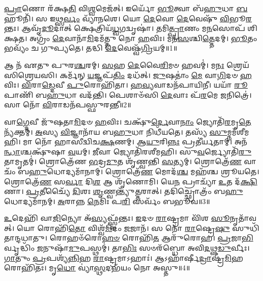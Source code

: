 \setcounter{anuvakam}{0}

\-\ul{𑌪𑍍𑌰𑌾}\-𑌣𑍋 𑌰᳴𑌕𑍍𑌷\-\ul{𑌤𑌿} 𑌵𑌿\-\ul{𑌶𑍍𑌵}\-𑌮𑍇𑌜᳴𑌤𑍍।
𑌇𑌰𑍍𑌯𑍋᳴ \ul{𑌭𑍂}\-𑌤𑍍𑌵𑌾 𑌬᳴\-\ul{𑌹𑍁}\-𑌧𑌾 \ul{𑌬}\-𑌹𑍂𑌨𑌿᳴।
𑌸 𑌇𑌥𑍍𑌸\-\ul{𑌰𑍍𑌵𑌂} 𑌵𑍍𑌯𑌾᳴𑌨𑌶𑍇।
𑌯𑍋 \ul{𑌦𑍇}\-𑌵𑍋 \ul{𑌦𑍇}\-𑌵𑍇𑌷𑍁᳴ \ul{𑌵𑌿}\-𑌭𑍂\-\ul{𑌰}\-𑌨𑍍𑌤𑌃।
𑌆𑌵𑍃᳴\-\ul{𑌦𑍂}\-𑌦𑌾𑌤𑍍 𑌕𑍍𑌷𑍇𑌤𑍍𑌰𑌿𑌯᳴\-\ul{𑌧𑍍𑌵}\-𑌗𑌦𑍍𑌵𑍃𑌷𑌾॑।
𑌤𑌮𑌿\-\ul{𑌤𑍍𑌪𑍍𑌰𑌾}\-𑌣𑌂 𑌮\-\ul{𑌨}\-𑌸𑍋𑌪᳴ 𑌶𑌿𑌕𑍍𑌷𑌤।
𑌅𑌗𑍍𑌰𑌂᳴ \ul{𑌦𑍇}\-𑌵𑌾𑌨𑌾᳴\-\ul{𑌮𑌿}\-𑌦𑌮᳴𑌤𑍍𑌤𑍁 𑌨𑍋 \ul{𑌹}\-𑌵𑌿𑌃।
𑌮𑌨᳴\-\ul{𑌸}\-𑌶𑍍𑌚𑌿\-\ul{𑌤𑍍𑌤𑍇}\-𑌦𑌮𑍍।
\-\ul{𑌭𑍂}\-𑌤𑌂 𑌭𑌵𑍍𑌯𑌂᳴ 𑌚 𑌗𑍁𑌪𑍍𑌯𑌤𑍇।
𑌤𑌦𑍍𑌧𑌿 \ul{𑌦𑍇}\-𑌵𑍇𑌷𑍍𑌵᳴\-\ul{𑌗𑍍𑌰𑌿}\-𑌯𑌮𑍍॥1॥

𑌆 𑌨᳴ 𑌏𑌤𑍁 𑌪𑍁𑌰\-\ul{𑌶𑍍𑌚}\-𑌰𑌮𑍍।
\-\ul{𑌸}\-𑌹 \ul{𑌦𑍇}\-𑌵𑍈\-\ul{𑌰𑌿}\-𑌮𑍞 𑌹𑌵𑌮𑍍॑।
𑌮\-\ul{𑌨𑌃} 𑌶𑍍𑌰𑍇𑌯᳴𑌸𑌿𑌶𑍍𑌰𑍇𑌯𑌸𑌿।
𑌕𑌰𑍍𑌮᳴𑌨𑍍 \ul{𑌯}\-𑌜𑍍𑌞𑌪᳴\-\ul{𑌤𑌿𑌂} 𑌦𑌧᳴𑌤𑍍।
\-\ul{𑌜𑍁}\-𑌷𑌤𑌾𑌂॑ \ul{𑌮𑍇} 𑌵𑌾\-\ul{𑌗𑌿}\-𑌦𑍞 \ul{𑌹}\-𑌵𑌿𑌃।
\-\ul{𑌵𑌿}\-𑌰𑌾\-\ul{𑌡𑍍𑌦𑍇}\-𑌵𑍀 \ul{𑌪𑍁}\-𑌰𑍋𑌹𑌿᳴𑌤𑌾।
\-\ul{𑌹}\-\-\ul{𑌵𑍍𑌯}\-𑌵𑌾𑌡𑌨᳴𑌪𑌾𑌯𑌿𑌨𑍀।
𑌯𑌯𑌾᳴ \ul{𑌰𑍂}\-𑌪𑌾𑌣𑌿᳴ 𑌬\-\ul{𑌹𑍁}\-𑌧𑌾 𑌵𑌦᳴𑌨𑍍𑌤𑌿।
𑌪𑍇𑌶𑌾𑍞᳴𑌸𑌿 \ul{𑌦𑍇}\-𑌵𑌾𑌃 𑌪᳴\-\ul{𑌰}\-𑌮𑍇 \ul{𑌜}\-𑌨𑌿𑌤𑍍𑌰𑍇॑।
𑌸𑌾 𑌨𑍋᳴ \ul{𑌵𑌿}\-𑌰𑌾𑌡𑌨᳴𑌪𑌸𑍍𑌫𑍁𑌰𑌨𑍍𑌤𑍀॥2॥

𑌵𑌾\-\ul{𑌗𑍍𑌦𑍇}\-𑌵𑍀 𑌜𑍁᳴𑌷𑌤𑌾\-\ul{𑌮𑌿}\-𑌦𑍞 \ul{𑌹}\-𑌵𑌿𑌃।
𑌚𑌕𑍍𑌷𑍁᳴\-\ul{𑌰𑍍𑌦𑍇}\-𑌵𑌾\-\ul{𑌨𑌾𑌂} 𑌜𑍍𑌯𑍋𑌤𑌿᳴\-\ul{𑌰}\-𑌮𑍃\-\ul{𑌤𑍇} 𑌨𑍍𑌯᳴𑌕𑍍𑌤𑌮𑍍।
\-\ul{𑌅}\-𑌸𑍍𑌯 \ul{𑌵𑌿}\-𑌜𑍍𑌞𑌾𑌨𑌾᳴𑌯 𑌬\-\ul{𑌹𑍁}\-𑌧𑌾 𑌨𑌿𑌧𑍀᳴𑌯𑌤𑍇।
𑌤𑌸𑍍𑌯᳴ \ul{𑌸𑍁}\-𑌮𑍍𑌨𑌮᳴𑌶𑍀𑌮𑌹𑌿।
𑌮𑌾 𑌨𑍋᳴ 𑌹𑌾𑌸𑍀𑌦𑍍𑌵𑌿𑌚\-\ul{𑌕𑍍𑌷}\-𑌣𑌮𑍍।
𑌆\-\ul{𑌯𑍁}\-𑌰𑌿\-\ul{𑌨𑍍𑌨𑌃} 𑌪𑍍𑌰𑌤𑍀॑𑌰𑍍𑌯𑌤𑌾𑌮𑍍।
𑌅𑌨᳴\-\ul{𑌨𑍍𑌧𑌾}\-𑌶𑍍𑌚𑌕𑍍𑌷𑍁᳴𑌷𑌾 \ul{𑌵}\-𑌯𑌮𑍍।
\-\ul{𑌜𑍀}\-𑌵𑌾 𑌜𑍍𑌯𑍋𑌤𑌿᳴𑌰𑌶𑍀𑌮𑌹𑌿।
𑌸𑍁\-\ul{𑌵}\-𑌰𑍍𑌜𑍍𑌯𑍋𑌤𑌿᳴\-\ul{𑌰𑍁}\-𑌤𑌾𑌮𑍃𑌤𑌮𑍍॑।
𑌶𑍍𑌰𑍋𑌤𑍍𑌰𑍇᳴𑌣 \ul{𑌭}\-𑌦𑍍𑌰\-\ul{𑌮𑍁}\-𑌤 𑌶𑍃᳴𑌣𑍍𑌵𑌨𑍍𑌤𑌿 \ul{𑌸}\-𑌤𑍍𑌯𑌮𑍍।
𑌶𑍍𑌰𑍋𑌤𑍍𑌰𑍇᳴\-\ul{𑌣} 𑌵𑌾𑌚𑌂᳴ 𑌬\-\ul{𑌹𑍁}\-𑌧𑍋𑌦𑍍𑌯𑌮𑌾᳴𑌨𑌾𑌮𑍍।
𑌶𑍍𑌰𑍋𑌤𑍍𑌰𑍇᳴\-\ul{𑌣} 𑌮𑍋𑌦᳴\-\ul{𑌶𑍍𑌚} 𑌮𑌹᳴𑌶𑍍𑌚 𑌶𑍍𑌰𑍂𑌯𑌤𑍇।
𑌶𑍍𑌰𑍋𑌤𑍍𑌰𑍇᳴\-\ul{𑌣} 𑌸\-\ul{𑌰𑍍𑌵𑌾} 𑌦𑌿\-\ul{𑌶} 𑌆 𑌶𑍃᳴𑌣𑍋𑌮𑌿।
𑌯𑍇\-\ul{𑌨} 𑌪𑍍𑌰𑌾𑌚𑍍𑌯𑌾᳴ \ul{𑌉}\-𑌤 𑌦᳴\-\ul{𑌕𑍍𑌷𑌿}\-𑌣𑌾।
\-\ul{𑌪𑍍𑌰}\-𑌤𑍀𑌚𑍍𑌯𑍈᳴ \ul{𑌦𑌿}\-𑌶𑌃 \ul{𑌶𑍃}\-𑌣𑍍𑌵𑌨𑍍𑌤𑍍𑌯𑍁᳴\-\ul{𑌤𑍍𑌤}\-𑌰𑌾𑌤𑍍।
𑌤𑌦𑌿𑌚𑍍𑌛𑍍𑌰𑍋𑌤𑍍𑌰𑌂᳴ 𑌬\-\ul{𑌹𑍁}\-𑌧𑍋𑌦𑍍𑌯𑌮𑌾᳴𑌨𑌮𑍍।
\-\ul{𑌅}\-𑌰𑌾𑌨𑍍𑌨 \ul{𑌨𑍇}\-𑌮𑌿𑌃 𑌪\-\ul{𑌰𑌿} 𑌸𑌰𑍍𑌵𑌂᳴ 𑌬𑌭𑍂𑌵॥3॥\anuvakamend[\-\ul{𑌅}\-\-\ul{𑌗𑍍𑌰𑌿}\-𑌯𑌮𑌨᳴𑌪𑌸𑍍𑌫𑍁𑌰𑌨𑍍𑌤𑍀 \ul{𑌸}\-𑌤𑍍𑌯𑍞 \ul{𑌸}\-𑌪𑍍𑌤 𑌚᳴]

\-\ul{𑌉}\-𑌦𑍇𑌹𑌿᳴ 𑌵𑌾\-\ul{𑌜𑌿}\-𑌨𑍍𑌯𑍋 𑌅᳴\-\ul{𑌸𑍍𑌯}\-𑌫𑍍𑌸𑍍𑌵᳴𑌨𑍍𑌤𑌃।
\-\ul{𑌇}\-𑌦𑍞 \ul{𑌰𑌾}\-𑌷𑍍𑌟𑍍𑌰𑌮𑌾 𑌵𑌿᳴𑌶 \ul{𑌸𑍂}\-𑌨𑍃𑌤𑌾᳴𑌵𑌤𑍍।
𑌯𑍋 𑌰𑍋𑌹𑌿᳴\-\ul{𑌤𑍋} 𑌵𑌿𑌶𑍍𑌵᳴\-\ul{𑌮𑌿}\-𑌦𑌂 \ul{𑌜}\-𑌜𑌾𑌨᳴।
𑌸 𑌨𑍋᳴ \ul{𑌰𑌾}\-𑌷𑍍𑌟𑍍𑌰𑍇\-\ul{𑌷𑍁} 𑌸𑍁𑌧𑌿᳴𑌤𑌾𑌨𑍍𑌦𑌧𑌾𑌤𑍁।
𑌰𑍋𑌹𑍞᳴𑌰𑍋\-\ul{𑌹}\-\-\ul{𑍞} 𑌰𑍋𑌹𑌿᳴\-\ul{𑌤} 𑌆𑌰𑍁᳴𑌰𑍋𑌹।
\-\ul{𑌪𑍍𑌰}\-𑌜𑌾\-\ul{𑌭𑌿}\-𑌰𑍍𑌵𑍃𑌦𑍍𑌧𑌿𑌂᳴ \ul{𑌜}\-𑌨𑍁𑌷𑌾᳴\-\ul{𑌮𑍁}\-𑌪𑌸𑍍𑌥𑌮𑍍॑।
𑌤𑌾\-\ul{𑌭𑌿𑌃} 𑌸𑍞𑌰᳴𑌬𑍍𑌧𑍋 𑌅𑌵𑌿\-\ul{𑌦}\-𑌥𑍍𑌷\-\ul{𑌡𑍁}\-𑌰𑍍𑌵𑍀𑌃।
\-\ul{𑌗𑌾}\-𑌤𑍁𑌂 \ul{𑌪𑍍𑌰}\-𑌪𑌶𑍍𑌯᳴\-\ul{𑌨𑍍𑌨𑌿}\-𑌹 \ul{𑌰𑌾}\-𑌷𑍍𑌟𑍍𑌰𑌮𑌾\-𑌽𑌹𑌾𑌃॑।
𑌆𑌽𑌹𑌾᳴𑌰𑍍\mbox{}𑌷𑍀\-\ul{𑌦𑍍𑌰𑌾}\-𑌷𑍍𑌟𑍍𑌰\-\ul{𑌮𑌿}\-𑌹 𑌰𑍋𑌹𑌿᳴𑌤𑌃।
𑌮𑍃\-\ul{𑌧𑍋} 𑌵𑍍𑌯𑌾॑\-\ul{𑌸𑍍𑌥}\-𑌦𑌭᳴𑌯𑌂 𑌨𑍋 𑌅𑌸𑍍𑌤𑍁॥4॥

